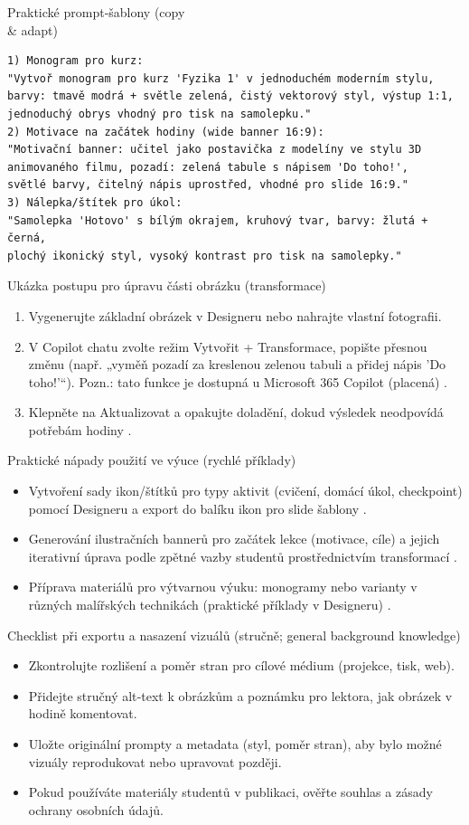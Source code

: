 Praktické prompt‑šablony (copy \\ \& adapt)
\begin{verbatim}
1) Monogram pro kurz:
"Vytvoř monogram pro kurz 'Fyzika 1' v jednoduchém moderním stylu,
barvy: tmavě modrá + světle zelená, čistý vektorový styl, výstup 1:1,
jednoduchý obrys vhodný pro tisk na samolepku."
2) Motivace na začátek hodiny (wide banner 16:9):
"Motivační banner: učitel jako postavička z modelíny ve stylu 3D
animovaného filmu, pozadí: zelená tabule s nápisem 'Do toho!',
světlé barvy, čitelný nápis uprostřed, vhodné pro slide 16:9."
3) Nálepka/štítek pro úkol:
"Samolepka 'Hotovo' s bílým okrajem, kruhový tvar, barvy: žlutá + černá,
plochý ikonický styl, vysoký kontrast pro tisk na samolepky."
\end{verbatim}

Ukázka postupu pro úpravu části obrázku (transformace)
\begin{enumerate}
  \item Vygenerujte základní obrázek v Designeru nebo nahrajte vlastní fotografii.
  \item V Copilot chatu zvolte režim Vytvořit + Transformace, popište přesnou změnu (např. „vyměň pozadí za kreslenou zelenou tabuli a přidej nápis 'Do toho!'“). Pozn.: tato funkce je dostupná u Microsoft 365 Copilot (placená) \cite{kb_ai_101_tipu_pdf_04e4a115_page_52_2}.
  \item Klepněte na Aktualizovat a opakujte doladění, dokud výsledek neodpovídá potřebám hodiny \cite{kb_ai_101_tipu_pdf_04e4a115_page_52_2}.
\end{enumerate}

Praktické nápady použití ve výuce (rychlé příklady)
\begin{itemize}
  \item Vytvoření sady ikon/štítků pro typy aktivit (cvičení, domácí úkol, checkpoint) pomocí Designeru a export do balíku ikon pro slide šablony \cite{kb_ai_101_tipu_pdf_04e4a115_page_51_1}.
  \item Generování ilustračních bannerů pro začátek lekce (motivace, cíle) a jejich iterativní úprava podle zpětné vazby studentů prostřednictvím transformací \cite{kb_ai_101_tipu_pdf_04e4a115_page_52_2}.
  \item Příprava materiálů pro výtvarnou výuku: monogramy nebo varianty v různých malířských technikách (praktické příklady v Designeru) \cite{kb_ai_101_tipu_pdf_04e4a115_page_51_1}.
\end{itemize}

Checklist při exportu a nasazení vizuálů (stručně; general background knowledge)
\begin{itemize}
  \item Zkontrolujte rozlišení a poměr stran pro cílové médium (projekce, tisk, web).
  \item Přidejte stručný alt‑text k obrázkům a poznámku pro lektora, jak obrázek v hodině komentovat.
  \item Uložte originální prompty a metadata (styl, poměr stran), aby bylo možné vizuály reprodukovat nebo upravovat později. 
  \item Pokud používáte materiály studentů v publikaci, ověřte souhlas a zásady ochrany osobních údajů. 
\end{itemize}

